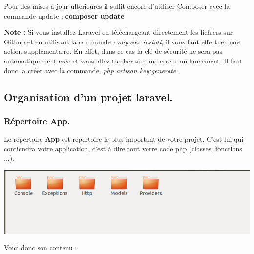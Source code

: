 \documentclass[12pt,a4paper]{article}
\begin{document}
\newpage

Pour des mises à jour ultérieures il suffit encore d'utiliser Composer avec la commande update : \textbf{composer update}

\textbf{Note :} Si vous installez Laravel en téléchargeant directement les fichiers sur Github et en utilisant la commande \textit{composer install}, il vous faut effectuer une action supplémentaire. En effet, dans ce cas la clé de sécurité ne sera pas automatiquement créé et vous allez tomber sur une erreur au lancement. Il faut donc la créer avec la commande.
\textit{php artisan key:generate}.





\subsection{Organisation d'un projet laravel.}


\subsubsection{Répertoire App.}
Le répertoire \textbf{App} est répertoire le plus important de votre projet. C'est lui qui contiendra
votre application, c'est à dire tout votre code php (classes, fonctions ...).\\

\begin{center}
\includegraphics[scale=0.7]{img/gapp.png}
\end{center}

\vspace{0.5cm}

Voici donc son contenu :
\end{document}
